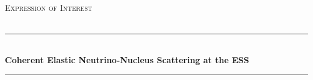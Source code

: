 \documentclass[12pt]{article}
\begin{document}
\begin{titlepage}

\newcommand{\HRule}{\rule{\linewidth}{0.5mm}} %

\center %
 

\textsc{\LARGE }\\[1.5cm] %
\textsc{\Large Expression of Interest}\\[0.5cm] %
\textsc{\large }\\[0.5cm] %


\HRule \\[0.6cm]
{ \large \bfseries Coherent Elastic Neutrino-Nucleus Scattering  at the ESS}\\[0.4cm] %
\HRule \\[1.0cm]
 




~


\end{titlepage}
\end{document}

